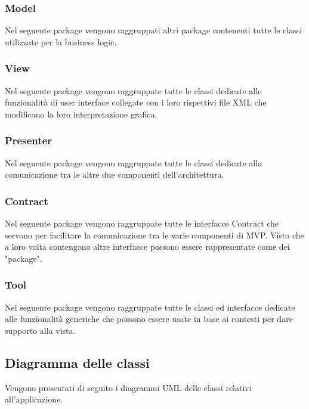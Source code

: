 \subsubsection{Model}
Nel seguente package vengono raggruppati altri package contenenti tutte le classi utilizzate per la business logic. 

\subsubsection{View}
Nel seguente package vengono raggruppate tutte le classi dedicate alle funzionalità di user interface collegate con i loro rispettivi file XML che modificano la loro interpretazione grafica.

\subsubsection{Presenter}
Nel seguente package vengono raggruppate tutte le classi dedicate alla comunicazione tra le altre due componenti dell'architettura.

\subsubsection{Contract}
Nel seguente package vengono raggruppate tutte le interfacce Contract che servono per facilitare la comunicazione tra le varie componenti di MVP. Visto che a loro volta contengono altre interfacce possono essere rappresentate come dei "package".

\subsubsection{Tool}
Nel seguente package vengono raggruppate tutte le classi ed interfacce dedicate alle funzionalità generiche che possono essere usate in base ai contesti per dare supporto alla vista.


\subsection{Diagramma delle classi}
Vengono presentati di seguito i diagrammi UML delle classi relativi all'applicazione.

